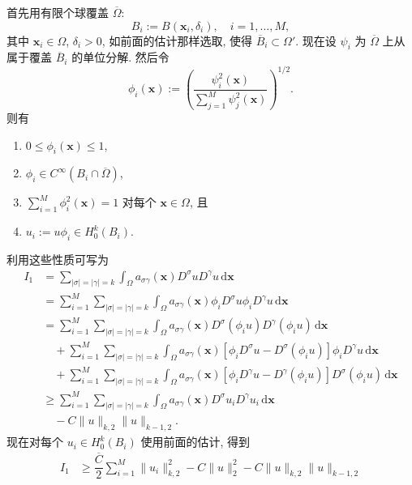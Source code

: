 \begin{Proof}
首先用有限个球覆盖 $\overline\Omega$:
\begin{equation}\label{eq:garding-localization-finite-ball-cover}
B_i:=B(\bm{x}_i,\delta_i),\quad i=1,\ldots,M,
\end{equation}
其中 $\bm{x}_i\in\Omega$, $\delta_i>0$, 如前面的估计那样选取, 使得 $\overline B_i\subset\Omega\prime$. 现在设 $\psi_i$ 为 $\overline\Omega$ 上从属于覆盖 $\overline B_i$ 的单位分解. 然后令
\begin{equation}\label{eq:garding-square-normalized-partition}
\phi_i(\bm{x}):=\left(\dfrac{\psi_i^2(\bm{x})}{\sum_{j=1}^M\psi_j^2(\bm{x})}\right)^{1/2}.
\end{equation}
则有\begin{enumerate}
\item $0\leq\phi_i(\bm{x})\leq1$,
\item $\phi_i\in C^\infty(B_i\cap\overline\Omega)$,
\item $\sum_{i=1}^M\phi_i^2(\bm{x})=1$ 对每个 $\bm{x}\in\Omega$, 且
\item $u_i:=u\phi_i\in H_0^k(B_i)$.
\end{enumerate}利用这些性质可写为\[\begin{aligned}
I_1&=\sum_{|\sigma|=|\gamma|=k}\int_\Omega a_{\sigma\gamma}(\bm{x})D^\sigma uD^\gamma u\,\mathrm{d}\bm{x}\\
&=\sum_{i=1}^M\sum_{|\sigma|=|\gamma|=k}\int_\Omega a_{\sigma\gamma}(\bm{x})\phi_iD^\sigma u\phi_iD^\gamma u\,\mathrm{d}\bm{x}\\
&=\sum_{i=1}^M\sum_{|\sigma|=|\gamma|=k}\int_\Omega a_{\sigma\gamma}(\bm{x})D^\sigma(\phi_i u)D^\gamma(\phi_i u)\,\mathrm{d}\bm{x}\\
&\quad+\sum_{i=1}^M\sum_{|\sigma|=|\gamma|=k}\int_\Omega a_{\sigma\gamma}(\bm{x})[\phi_iD^\sigma u-D^\sigma(\phi_i u)]\phi_iD^\gamma u\,\mathrm{d}\bm{x}\\
&\quad+\sum_{i=1}^M\sum_{|\sigma|=|\gamma|=k}\int_\Omega a_{\sigma\gamma}(\bm{x})[\phi_iD^\gamma u-D^\gamma(\phi_i u)]D^\sigma(\phi_i u)\,\mathrm{d}\bm{x}\\
&\geq\sum_{i=1}^M\sum_{|\sigma|=|\gamma|=k}\int_\Omega a_{\sigma\gamma}(\bm{x})D^\sigma u_iD^\gamma u_i\,\mathrm{d}\bm{x}\\
&\quad-C\|u\|_{k,2}\|u\|_{k-1,2}.
\end{aligned}\]现在对每个 $u_i\in H_0^k(B_i)$ 使用前面的估计, 得到\[\begin{aligned}
I_1&\geq\dfrac{\overline C}{2}\sum_{i=1}^M\|u_i\|_{k,2}^2-C\|u\|_2^2-C\|u\|_{k,2}\|u\|_{k-1,2}\\

\end{aligned}\]
\end{Proof}
